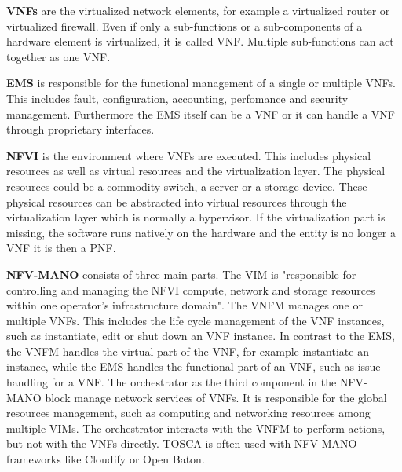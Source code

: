 \textbf{\acp{VNF}} are the virtualized network elements, for example a virtualized router or virtualized firewall.
Even if only a sub-functions or a sub-components of a hardware element is virtualized, it is called \ac{VNF}.\cite[cf.]{Kahn:2015}
Multiple sub-functions can act together as one \ac{VNF}.

\textbf{\ac{EMS}} is responsible for the functional management of a single or multiple \acp{VNF}.\cite[cf.]{Kahn:2015}
This includes fault, configuration, accounting, perfomance and security management.\cite[cf.]{Kahn:2015}
Furthermore the \ac{EMS} itself can be a \ac{VNF} or it can handle a \ac{VNF} through proprietary interfaces.\cite[cf.]{Kahn:2015}

\textbf{\ac{NFVI}} is the environment where \acp{VNF} are executed.
This includes physical resources as well as virtual resources and the virtualization layer.
The physical resources could be a commodity switch, a server or a storage device.
These physical resources can be abstracted into virtual resources through the virtualization layer which is normally a hypervisor.
If the virtualization part is missing, the software runs natively on the hardware and the entity is no longer a \ac{VNF} it is then a \ac{PNF}.\cite[cf.]{Kahn:2015}

\textbf{\ac{NFV-MANO}} consists of three main parts.
The \ac{VIM} is "responsible for controlling and managing the NFVI compute, network and storage resources within one operator’s infrastructure domain"\cite{Kahn:2015}.
The \ac{VNFM} manages one or multiple \acp{VNF}.
This includes the life cycle management of the \ac{VNF} instances, such as instantiate, edit or shut down an \ac{VNF} instance.\cite[cf.]{Tosca:NFV}
In contrast to the \ac{EMS}, the \ac{VNFM} handles the virtual part of the \ac{VNF}, for example instantiate an instance, while the \ac{EMS} handles the functional part of an \ac{VNF}, such as issue handling for a \ac{VNF}.
The orchestrator as the third component in the \ac{NFV-MANO} block manage network services of \acp{VNF}.
It is responsible for the global resources management, such as computing and networking resources among multiple \acp{VIM}.\cite[cf.]{Kahn:2015}
The orchestrator interacts with the \ac{VNFM} to perform actions, but not with the \acp{VNF} directly.\cite[cf.]{Kahn:2015}
\ac{TOSCA} is often used with \ac{NFV-MANO} frameworks like Cloudify or Open Baton.\cite[cf.]{Tosca:NFV}

